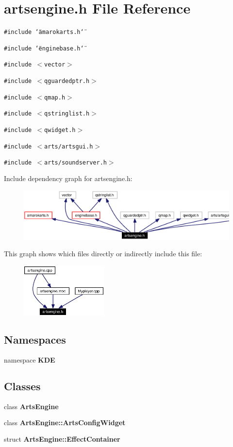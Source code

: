 \section{artsengine.h File Reference}
\label{artsengine_8h}


{\tt \#include \char`\"{}amarokarts.h\char`\"{}}\par
{\tt \#include \char`\"{}enginebase.h\char`\"{}}\par
{\tt \#include $<$vector$>$}\par
{\tt \#include $<$qguardedptr.h$>$}\par
{\tt \#include $<$qmap.h$>$}\par
{\tt \#include $<$qstringlist.h$>$}\par
{\tt \#include $<$qwidget.h$>$}\par
{\tt \#include $<$arts/artsgui.h$>$}\par
{\tt \#include $<$arts/soundserver.h$>$}\par


Include dependency graph for artsengine.h:\begin{figure}[H]
\begin{center}
\leavevmode
\includegraphics[width=364pt]{artsengine_8h__incl}
\end{center}
\end{figure}


This graph shows which files directly or indirectly include this file:\begin{figure}[H]
\begin{center}
\leavevmode
\includegraphics[width=125pt]{artsengine_8h__dep__incl}
\end{center}
\end{figure}
\subsection*{Namespaces}
\begin{CompactItemize}
\item 
namespace {\bf KDE}
\end{CompactItemize}
\subsection*{Classes}
\begin{CompactItemize}
\item 
class {\bf Arts\-Engine}
\item 
class {\bf Arts\-Engine::Arts\-Config\-Widget}
\item 
struct {\bf Arts\-Engine::Effect\-Container}
\end{CompactItemize}

